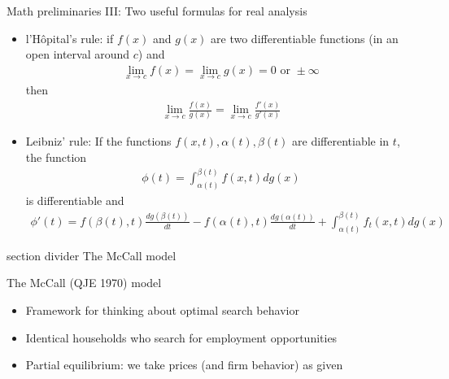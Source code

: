 \documentclass[9pt]{beamer}
\newcommand{\sectiondivider}[1]{
	\begin{frame}[plain]
		\vfill
		\begin{beamercolorbox}[wd=.84\textwidth,sep=1.1em,center,rounded=true]{section divider}
			{\usebeamerfont{section title} #1}
		\end{beamercolorbox}
		\vfill
	\end{frame}
}
\newcommand{\bit}{\begin{itemize}}
\newcommand{\eit}{\end{itemize}}
\newcommand{\bc}{\color{blue}}
\begin{document}
\begin{frame}{Math preliminaries III: Two useful formulas for real analysis}

\bit
\setlength\itemsep{2em}

\item {\bc l'H\^{o}pital's rule}: if $f(x)$ and $g(x)$ are two differentiable functions (in an open interval around $c$) and
\begin{eqnarray}
\lim\limits_{x \rightarrow c} f(x) = \lim\limits_{x \rightarrow c} g(x) = 0 \text{ or } \pm \infty \nonumber
\end{eqnarray}
then
\begin{eqnarray}
\lim\limits_{x \rightarrow c} \frac{f(x)}{g(x)}= \lim\limits_{x \rightarrow c} \frac{f'(x)}{g'(x)} \nonumber
\end{eqnarray}

\item {\bc Leibniz' rule}: If the functions $f(x,t), \alpha(t), \beta(t)$ are differentiable in $t$, the function
\begin{eqnarray}
\phi(t) = \int_{\alpha(t)}^{\beta(t)} f(x,t) dg(x) \nonumber
\end{eqnarray}
is differentiable and
\begin{eqnarray}
\phi'(t) = f(\beta(t),t) \frac{dg(\beta(t))}{dt} - f(\alpha(t),t)\frac{dg(\alpha(t))}{dt} + \int_{\alpha(t)}^{\beta(t)} f_t(x,t) dg(x) \nonumber
\end{eqnarray}

\eit
\end{frame}



\sectiondivider{The McCall model}


\begin{frame}{The McCall (QJE 1970) model}

\bit
	\setlength\itemsep{2em}
	
	\item Framework for thinking about optimal search behavior
	
	\item Identical households who search for employment opportunities
	
	\item Partial equilibrium: we take prices (and firm behavior) as given
\eit

\end{frame}
\end{document}
